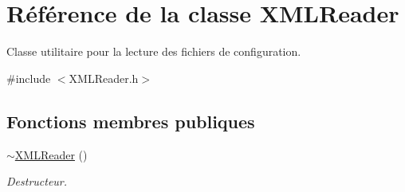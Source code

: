 \hypertarget{classXMLReader}{\section{Référence de la classe X\-M\-L\-Reader}
\label{classXMLReader}
}


Classe utilitaire pour la lecture des fichiers de configuration.  




{\ttfamily \#include $<$X\-M\-L\-Reader.\-h$>$}

\subsection*{Fonctions membres publiques}
\begin{DoxyCompactItemize}
\item 
\hypertarget{classXMLReader_a73065c7758f26ef69387e315c96d13ac}{\hyperlink{classXMLReader_a73065c7758f26ef69387e315c96d13ac}{$\sim$\-X\-M\-L\-Reader} ()}\label{classXMLReader_a73065c7758f26ef69387e315c96d13ac}

\begin{DoxyCompactList}\small\item\em Destructeur. \end{DoxyCompactList}\end{DoxyCompactItemize}
